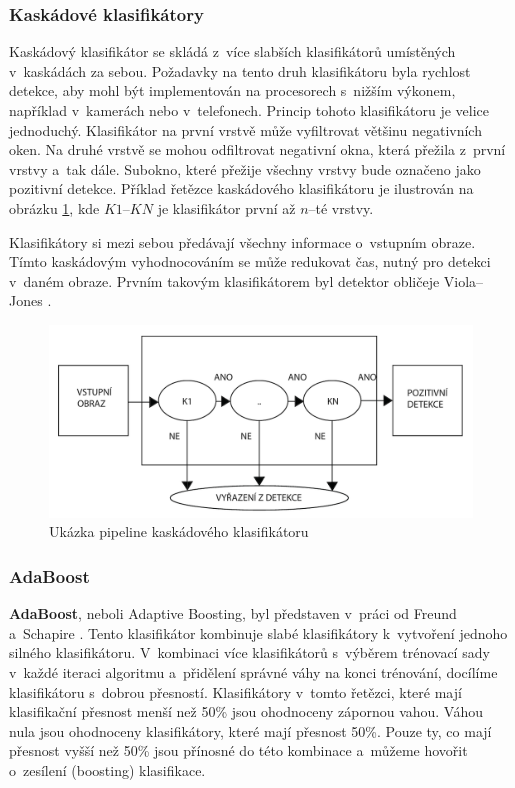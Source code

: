\subsubsection*{Kaskádové klasifikátory} %
Kaskádový klasifikátor se skládá z~více slabších klasifikátorů umístěných v~kaskádách za sebou. Požadavky na tento druh klasifikátoru byla rychlost detekce, aby mohl být implementován na procesorech s~nižším výkonem, například v~kamerách nebo v~telefonech. Princip tohoto klasifikátoru je velice jednoduchý. Klasifikátor na první vrstvě může vyfiltrovat většinu negativních oken. Na druhé vrstvě se mohou odfiltrovat  negativní okna, která přežila z~první vrstvy a~tak dále. Subokno, které přežije všechny vrstvy bude označeno jako pozitivní detekce. Příklad řetězce kaskádového klasifikátoru je ilustrován na obrázku \ref{fig:ccpipeline}, kde $K1$--$KN$ je klasifikátor první až $n$--té vrstvy.

Klasifikátory si mezi sebou předávají všechny informace o~vstupním obraze. Tímto kaskádovým vyhodnocováním se může redukovat čas, nutný pro detekci v~daném obraze. Prvním takovým klasifikátorem byl detektor obličeje Viola--Jones \cite{violajones}.  
\begin{figure}[H]
\centering
\includegraphics[width=.8\linewidth]{figures/cascadeClass.pdf}
\caption{Ukázka pipeline kaskádového klasifikátoru}
\label{fig:ccpipeline}
\end{figure}

\subsubsection*{AdaBoost}
\textbf{AdaBoost}, neboli Adaptive Boosting, byl představen v~práci od Freund a~Schapire \cite{adaboost}. Tento klasifikátor kombinuje slabé klasifikátory k~vytvoření jednoho silného klasifikátoru. V~kombinaci více klasifikátorů s~výběrem trénovací sady v~každé iteraci algoritmu a~přidělení správné váhy na konci trénování, docílíme klasifikátoru s~dobrou přesností. Klasifikátory v~tomto řetězci, které mají klasifikační přesnost menší než 50\% jsou ohodnoceny zápornou vahou. Váhou nula jsou ohodnoceny klasifikátory, které mají přesnost 50\%. Pouze ty, co mají přesnost vyšší než 50\% jsou přínosné do této kombinace a~můžeme hovořit o~zesílení (boosting) klasifikace. 

